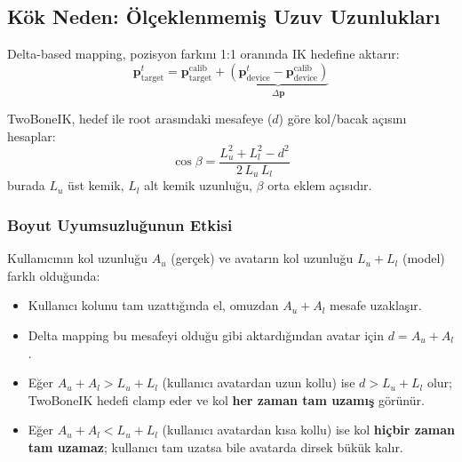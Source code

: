 \documentclass[11pt,a4paper]{article}
\begin{document}
\subsection{K\"ok Neden: \"Ol\c{c}eklenmemi\c{s} Uzuv Uzunluklar{\i}}
\label{sec:boy_kok}

Delta-based mapping, pozisyon fark{\i}n{\i} 1:1 oran{\i}nda IK hedefine
aktar{\i}r:
\begin{equation}
    \mathbf{p}_{\text{target}}^{t} = \mathbf{p}_{\text{target}}^{\text{calib}} +
    \underbrace{\left(\mathbf{p}_{\text{device}}^{t} - \mathbf{p}_{\text{device}}^{\text{calib}}\right)}_{\Delta \mathbf{p}}
    \label{eq:delta}
\end{equation}

TwoBoneIK, hedef ile root aras{\i}ndaki mesafeye ($d$) g\"ore kol/bacak
a\c{c}{\i}s{\i}n{\i} hesaplar:
\begin{equation}
    \cos\beta = \frac{L_u^2 + L_l^2 - d^2}{2\,L_u\,L_l}
    \label{eq:cos}
\end{equation}
burada $L_u$ \"ust kemik, $L_l$ alt kemik uzunlu\u{g}u, $\beta$ orta
eklem a\c{c}{\i}s{\i}d{\i}r.

\subsubsection{Boyut Uyumsuzlu\u{g}unun Etkisi}

Kullan{\i}c{\i}n{\i}n kol uzunlu\u{g}u $A_u$ (ger\c{c}ek) ve avatar{\i}n kol
uzunlu\u{g}u $L_u + L_l$ (model) farkl{\i} oldu\u{g}unda:

\begin{itemize}[nosep]
    \item Kullan{\i}c{\i} kolunu tam uzatt{\i}\u{g}{\i}nda el, omuzdan
          $A_u + A_l$ mesafe uzakla\c{s}{\i}r.
    \item Delta mapping bu mesafeyi oldu\u{g}u gibi aktard{\i}\u{g}{\i}ndan
          avatar i\c{c}in $d = A_u + A_l$.
    \item E\u{g}er $A_u + A_l > L_u + L_l$ (kullan{\i}c{\i} avatardan
          uzun kollu) ise $d > L_u + L_l$ olur;
          TwoBoneIK hedefi clamp eder ve kol \textbf{her zaman tam
          uzam{\i}\c{s}} g\"or\"un\"ur.
    \item E\u{g}er $A_u + A_l < L_u + L_l$ (kullan{\i}c{\i} avatardan
          k{\i}sa kollu) ise kol \textbf{hi\c{c}bir zaman tam uzamaz};
          kullan{\i}c{\i} tam uzatsa bile avatarda dirsek b\"uk\"uk kal{\i}r.
\end{itemize}
\end{document}
